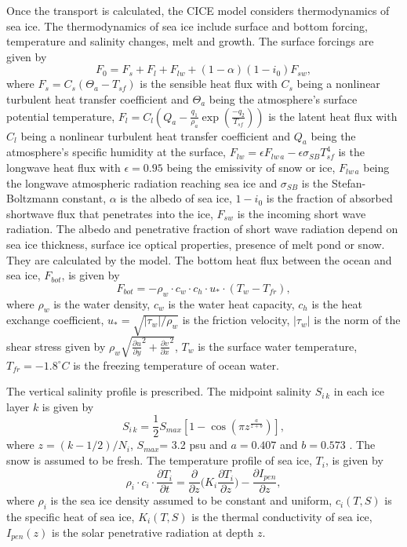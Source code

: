 Once the transport is calculated, the CICE model considers thermodynamics of sea ice. The thermodynamics of sea ice include surface and bottom forcing, temperature and salinity changes, melt and growth. The surface forcings are given by
\begin{equation}
F_0 = F_s +F_l+F_{lw}+(1-\alpha)(1-i_0)F_{sw},
\end{equation}
where $F_s = C_s(\Theta_a-T_{sf})$ is the sensible heat flux with $C_s$ being a nonlinear turbulent heat transfer coefficient and $\Theta_a$ being the atmosphere's surface potential temperature, $F_l = C_l (Q_a-\frac{q_1}{\rho_a}\exp(\frac{-q_2}{T_{sf}}))$ is the latent heat flux with $C_l $ being a nonlinear turbulent heat transfer coefficient and $Q_a$ being the atmosphere's specific humidity at the surface, $F_{lw} = \epsilon F_{lw\,a} - \epsilon\sigma_{SB}T_{sf}^4$ is the longwave heat flux with $\epsilon=0.95$ being the emissivity of snow or ice, $F_{lw\,a}$ being the longwave atmospheric radiation reaching sea ice and $\sigma_{SB}$ is the Stefan-Boltzmann constant, $\alpha$ is the albedo of sea ice, $1-i_0$ is the fraction of absorbed shortwave flux that penetrates into the ice, $F_{sw}$ is the incoming short wave radiation. The albedo and penetrative fraction of short wave radiation depend on sea ice thickness, surface ice optical properties, presence of melt pond or snow. They are calculated by the model. The bottom heat flux between the ocean and sea ice, $F_{bot}$, is given by
\begin{equation}
F_{bot} = - \rho_w \cdot c_w \cdot c_h \cdot u_* \cdot (T_w - T_{fr}),
\end{equation}
where $\rho_w$ is the water density, $c_w$ is the water heat capacity, $c_h$ is the heat exchange coefficient, $u_* = \sqrt{|\tau_w|/\rho_w}$ is the friction velocity, $|\tau_w|$ is the norm of the shear stress given by $\rho_w \sqrt{\frac{\partial u}{\partial y}^2+\frac{\partial v}{\partial x}^2}$, $T_w$ is the surface water temperature, $T_{fr}=-1.8^\circ C$ is the freezing temperature of ocean water.

The vertical salinity profile is prescribed. The midpoint salinity $S_{i\,k}$ in each ice layer $k$ is given by
\begin{equation}
S_{i\,k} = \frac{1}{2}S_{max}[1-\cos(\pi z^{\frac{a}{z+b}})],
\end{equation}
where $z = (k-1/2)/N_i$, $S_{max}$= 3.2 psu and $a=0.407$ and $b=0.573$ \citep{Hunke:2008ly}. The snow is assumed to be fresh. The temperature profile of sea ice, $T_i$, is given by
\begin{equation}
\rho_i \cdot c_i\cdot \frac{\partial T_i}{\partial t}= \frac{\partial}{\partial z}\big(K_i \frac{\partial T_i}{\partial z}\big) - \frac{\partial I_{pen}}{\partial z},
\end{equation}
where $\rho_i$ is the sea ice density assumed to be constant and uniform, $c_i(T,S) $ is the specific heat of sea ice, $K_i(T,S)$ is the thermal conductivity of sea ice, $I_{pen}(z)$ is the solar penetrative radiation at depth $z$.

